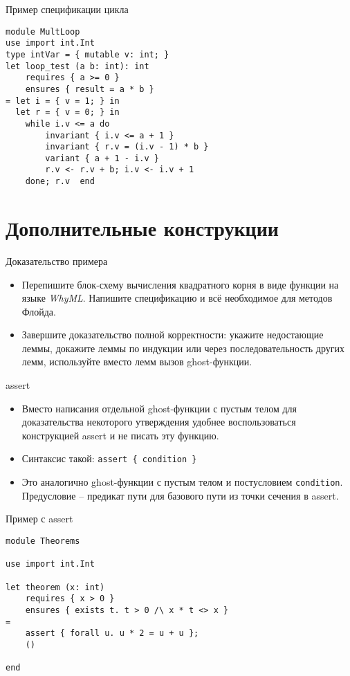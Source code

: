 \documentclass[hyperref={unicode=true}]{beamer}
\begin{document}
    \begin{frame}[fragile]{Пример спецификации цикла}
    \begin{lstlisting}
module MultLoop
use import int.Int
type intVar = { mutable v: int; }
let loop_test (a b: int): int
    requires { a >= 0 }
    ensures { result = a * b }
= let i = { v = 1; } in
  let r = { v = 0; } in
    while i.v <= a do
        invariant { i.v <= a + 1 }
        invariant { r.v = (i.v - 1) * b }
        variant { a + 1 - i.v }
        r.v <- r.v + b; i.v <- i.v + 1
    done; r.v  end
    \end{lstlisting}
    \end{frame}

    \section{Дополнительные конструкции}

    \begin{frame}{Доказательство примера}
    \begin{itemize}
    \item
    Перепишите блок-схему вычисления квадратного корня в виде функции
    на языке \textsl{WhyML}. Напишите спецификацию и всё необходимое
    для методов Флойда.
    \item
    Завершите доказательство полной корректности: укажите недостающие
    леммы, докажите леммы по индукции или через последовательность
    других лемм, используйте вместо лемм вызов ghost-функции.
    \end{itemize}
    \end{frame}

    \begin{frame}{assert}
    \begin{itemize}
    \item
    Вместо написания отдельной ghost-функции с пустым телом для
    доказательства некоторого утверждения удобнее воспользоваться
    конструкцией assert и не писать эту функцию.
    \item
    Синтаксис такой: \texttt{assert \{ condition \}}
    \item
    Это аналогично ghost-функции с пустым телом и постусловием
    \texttt{condition}. Предусловие -- предикат пути для базового
    пути из точки сечения в assert.
    \end{itemize}
    \end{frame}

    \begin{frame}[fragile]{Пример с assert}
    \begin{lstlisting}
module Theorems

use import int.Int

let theorem (x: int)
    requires { x > 0 }
    ensures { exists t. t > 0 /\ x * t <> x }
=
    assert { forall u. u * 2 = u + u };
    ()

end
    \end{lstlisting}
    \end{frame}
\end{document}
